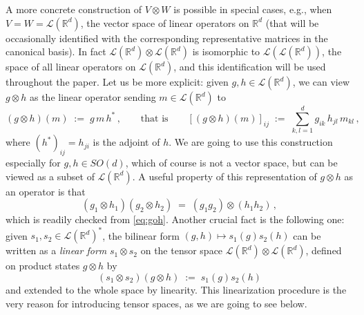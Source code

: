 \documentclass[a4paper,reqno,11pt]{amsart}
\numberwithin{equation}{section}
\newcommand{\cL}{{\ensuremath{\mathcal L}} }
\newcommand{\R}{\mathbb{R}}
\begin{document}
A more concrete construction of $V \otimes W$ is possible
in special cases, e.g., when $V = W = \cL(\R^d)$,
the vector space of linear operators on $\R^d$ (that will be
occasionally identified with the corresponding representative
matrices in the canonical basis).
In fact $\cL(\R^d) \otimes \cL(\R^d)$ is isomorphic to
$\cL(\cL(\R^d))$,
the space of all linear operators on $\cL(\R^d)$, and this
identification will be used throughout the paper.
Let us be more explicit: given $g,h \in \cL(\R^d)$,
we can view $g \otimes h$ as the linear operator sending $m \in \cL(\R^d)$ to
\begin{equation} \label{eq:goh}
	(g \otimes h) (m) \;:=\; g \, m \, h^* \,,
	\qquad \text{that is} \qquad
	[(g \otimes h) (m)]_{ij} \;:=\; \sum_{k,l = 1}^d
	g_{ik} \, h_{jl} \, m_{kl}\,,
\end{equation}
where $(h^*)_{ij} =  h_{ji}$ is the adjoint of $h$.
We are going to use this construction especially for $g, h \in SO(d)$, which of course
is not a vector space, but can be viewed as a subset of $\cL(\R^d)$.
A useful property of this representation of $g \otimes h$
as an operator is that
\begin{equation} \label{eq:comp}
	(g_1 \otimes h_1)(g_2 \otimes h_2) \;=\; (g_1 g_2) \otimes (h_1 h_2)\,,
\end{equation}
which is readily checked from \eqref{eq:goh}.
Another crucial fact is the following one: given
$s_1, s_2 \in \cL(\R^d)^*$, the bilinear form
$(g,h) \mapsto s_1(g) s_2(h)$ can be written as a {\sl linear form}
$s_1 \otimes s_2$ on the tensor space $\cL(\R^d) \otimes \cL(\R^d)$,
defined on product states $g \otimes h$ by
\begin{equation} \label{eq:tensorlin}
	(s_1 \otimes s_2)(g \otimes h) \;:=\; s_1(g) s_2(h)
\end{equation}
and extended to the whole space by linearity.
This linearization procedure is the very reason for introducing
tensor spaces, as we are going to see below.
\end{document}
